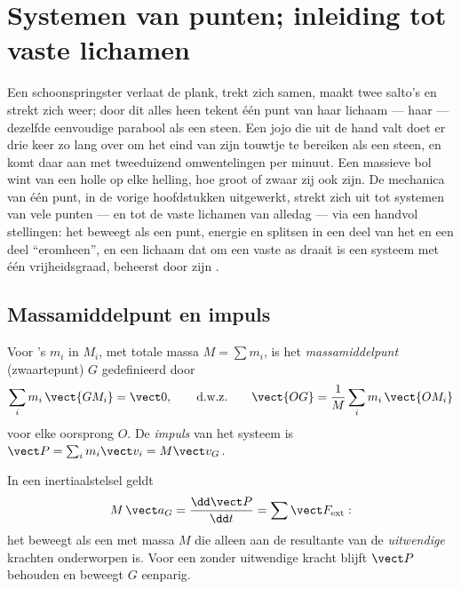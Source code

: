 \chapter{Systemen van punten; inleiding tot vaste lichamen}\label{ch:b1:systems-of-points}

Een schoonspringster verlaat de plank, trekt zich samen, maakt twee salto's en
strekt zich weer; door dit alles heen tekent één punt van haar lichaam --- haar
 --- dezelfde eenvoudige parabool als een steen. Een jojo die
uit de hand valt doet er drie keer zo lang over om het eind van zijn touwtje te
bereiken als een steen, en komt daar aan met tweeduizend omwentelingen per
minuut. Een massieve bol wint van een holle op elke helling, hoe groot of zwaar
zij ook zijn. De mechanica van één punt, in de vorige hoofdstukken uitgewerkt,
strekt zich uit tot systemen van vele punten --- en tot de vaste lichamen van
alledag --- via een handvol stellingen: het  beweegt als een punt,
energie en  splitsen in een deel van het  en een deel
``eromheen'', en een lichaam dat om een vaste as draait is een systeem met één
vrijheidsgraad, beheerst door zijn .

\section{Massamiddelpunt en impuls}

\begin{definition}\label{def:b1:systems-of-points:cm}
Voor 's $m_i$ in $M_i$, met totale massa $M = \sum m_i$, is het
\emph{massamiddelpunt} (zwaartepunt) $G$ gedefinieerd door
\[
\sum_i m_i\,\vect{GM_i} = \vect 0, \qquad\text{d.w.z.}\qquad
\vect{OG} = \frac{1}{M}\sum_i m_i\,\vect{OM_i}
\]
voor elke oorsprong $O$. De \emph{impuls} van het systeem is $\vect P =
\sum_i m_i\vect v_i = M\vect v_G$.
\end{definition}

\begin{theorem}\label{thm:b1:systems-of-points:cmtheorem}
In een inertiaalstelsel geldt
\[
M\,\vect a_G = \frac{\dd\vect P}{\dd t} = \sum\vect F_{\mathrm{ext}} :
\]
het  beweegt als een  met massa $M$ die alleen aan de
resultante van de \emph{uitwendige} krachten onderworpen is. Voor een  zonder uitwendige kracht blijft $\vect P$ behouden en beweegt $G$ eenparig.
\end{theorem}

